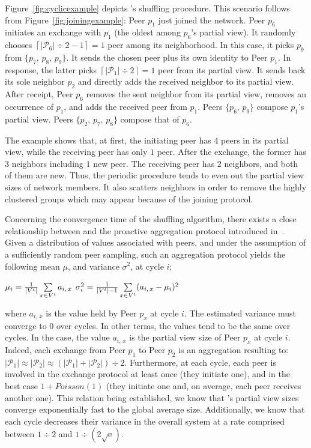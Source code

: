Figure~\ref{fig:cyclicexample} depicts \SPRAY's shuffling procedure. This
scenario follows from Figure~\ref{fig:joiningexample}: Peer $p_1$ just joined
the network. Peer $p_6$ initiates an exchange with $p_1$ (the oldest among 
$p_6$'s partial view). It randomly chooses
$\left\lceil{|\mathcal{P}_6|\div 2} - 1 \right \rceil = 1$ peer among its
neighborhood. In this case, it picks $p_9$ from $\{p_7,\,p_8,\,p_9\}$.  It sends
the chosen peer plus its own identity to Peer $p_1$. In response, the latter
picks $\left\lceil{|\mathcal{P}_1|\div 2}\right\rceil = 1$ peer from its partial
view. It sends back its sole neighbor $p_2$ and directly adds the received
neighbor to its partial view. After receipt, Peer $p_6$ removes the sent
neighbor from its partial view, removes an occurrence of $p_1$, and adds the
received peer from $p_1$. Peers $\{p_6,\,p_9\}$ compose $p_1$'s partial
view. Peers $\{p_2,\,p_7,\,p_8\}$ compose that of $p_6$.

The example shows that, at first, the initiating peer has $4$ peers in
its partial view, while the receiving peer has only $1$ peer.
After the exchange, the former has $3$ neighbors including $1$ new
peer. The receiving peer has $2$ neighbors, and both of them are
new. Thus, the periodic procedure tends to even out the partial view
sizes of network members. It also scatters neighbors in order to remove
the highly clustered groups which may appear because of the joining
protocol.

Concerning the convergence time of the shuffling algorithm, there
exists a close relationship between \SPRAY and the proactive
aggregation protocol introduced
in~\cite{jelasity2004epidemic}. Given a
distribution of values associated with peers, and under the assumption
of a sufficiently random peer sampling, such an aggregation protocol
yields the following mean $\mu$, and variance $\sigma^2$, at cycle
$i$;
\begin{center}
  $\mu_i = {1\over{|V^t|}} \sum\limits_{x \in V^t} a_{i,\,x}$
  \hfill
  $\sigma^2_i = {1\over{|V^t|-1}}\sum\limits_{x \in V^t}
  (a_{i,\,x} - \mu_i)^2$
\end{center}
where $a_{i,\,x}$ is the value held by Peer $p_x$ at cycle $i$. The
estimated variance must converge to $0$ over cycles. In other terms,
the values tend to be the same over cycles. In the \SPRAY case, the
value $a_{i,\,x}$ is the partial view size of Peer $p_x$ at cycle
$i$. Indeed, each exchange from Peer $p_1$ to Peer $p_2$ is an
aggregation resulting to:
$|\mathcal{P}_1|\approx|\mathcal{P}_2|\approx{(|\mathcal{P}_1| +
  |\mathcal{P}_2|) \div 2}$.  Furthermore, at each cycle, each peer is
involved in the exchange protocol at least once (they initiate one),
and in the best case $1+Poisson(1)$ (they initiate one and, on average,
each peer receives another one). This relation being established, we
know that \SPRAY's partial view sizes converge exponentially fast to
the global average size. Additionally, we know that each cycle
decreases their variance in the overall system at a rate comprised
between ${1\div 2}$ and $1\div ({2\sqrt{\text{e}}})$.

